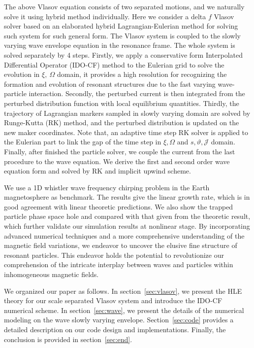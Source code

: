 The above Vlasov equation consists of two separated motions, and we naturally solve it using hybrid method individually. 
Here we consider a delta $f$ Vlasov solver based on an elaborated hybrid Lagrangian-Eulerian method for solving such system \cite{shiroto2022} for such general form.
The Vlasov system is coupled to the slowly varying wave envelope equation in the resonance frame. 
The whole system is solved separately by 4 steps.
Firstly, we apply a conservative form Interpolated Differential Operator (IDO-CF)  method to the Eulerian grid to solve the evolution in $\xi,~\Omega$ domain, it provides a high resolution for recognizing the formation and evolution of resonant structures due to the fast varying wave-particle interaction. 
Secondly, the perturbed current is then integrated from the perturbed distribution function with local equilibrium quantities.
Thirdly, the trajectory of Lagrangian markers sampled in slowly varying domain are solved by Runge-Kutta (RK) method, and the perturbed distribution is updated on the new maker coordinates.
Note that, an adaptive time step RK solver is applied to the Eulerian part to link the gap of the time step in $\xi,\Omega$ and $s,\vartheta,\mathcal{J}$ domain.
Finally, after finished the particle solver, we couple the current from the last procedure to the wave equation.
We derive the first and second order wave equation form and solved by RK and implicit upwind scheme.

We use a 1D whistler wave frequency chirping problem in the Earth magnetosphere as benchmark.
The results give the linear growth rate, which is in good agreement with linear theoretic predictions.
We also show the trapped particle phase space hole and compared with that given from the theoretic result, which further validate our simulation results at nonlinear stage.
By incorporating advanced numerical techniques and a more comprehensive understanding of the magnetic field variations, we endeavor to uncover the elusive fine structure of resonant particles. This endeavor holds the potential to revolutionize our comprehension of the intricate interplay between waves and particles within inhomogeneous magnetic fields.

We organized our paper as follows. In section~\ref{sec:vlasov}, we present the HLE theory for our scale separated Vlasov system and introduce the IDO-CF numerical scheme. In section~\ref{sec:wave}, we present the details of the numerical modeling on the wave slowly varying envelope. Section~\ref{sec:code} provides a detailed description on our code design and implementations. Finally, the conclusion is provided in section~\ref{sec:end}.

